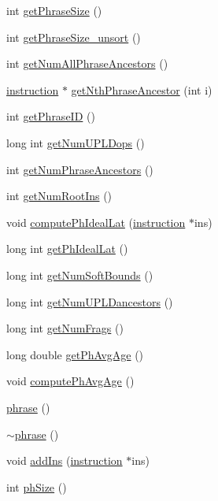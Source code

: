 \begin{DoxyCompactItemize}
\item 
int \hyperlink{classphrase_acb8ddc582eefcd2c65366319f89465f9}{getPhraseSize} ()
\item 
int \hyperlink{classphrase_a214d303bd1646e75a45855c7b9712ac7}{getPhraseSize\_\-unsort} ()
\item 
int \hyperlink{classphrase_afa8a3db74c2282bac47b136ddc8441e5}{getNumAllPhraseAncestors} ()
\item 
\hyperlink{classinstruction}{instruction} $\ast$ \hyperlink{classphrase_aaaaaefe94a150907b1cff6f99bb45d0a}{getNthPhraseAncestor} (int i)
\item 
int \hyperlink{classphrase_af752a00d3a1ec5ff1df4614ceb959027}{getPhraseID} ()
\item 
long int \hyperlink{classphrase_a48e689fefaabe6f63f6987e25fd70159}{getNumUPLDops} ()
\item 
int \hyperlink{classphrase_a8233a60f6da58ab8a72762da871e202f}{getNumPhraseAncestors} ()
\item 
int \hyperlink{classphrase_a15938fc7a89b507ee68da569a8446552}{getNumRootIns} ()
\item 
void \hyperlink{classphrase_a3802e4135d44de3591bf71a939b37123}{computePhIdealLat} (\hyperlink{classinstruction}{instruction} $\ast$ins)
\item 
long int \hyperlink{classphrase_ae207e38d77f69c4728278686822a901b}{getPhIdealLat} ()
\item 
long int \hyperlink{classphrase_afed9a471ff76a9155ccf016441753456}{getNumSoftBounds} ()
\item 
long int \hyperlink{classphrase_abcf56d6bce291a90c7a95f336b9230ea}{getNumUPLDancestors} ()
\item 
long int \hyperlink{classphrase_aad5e612377e6573abc754ad5b9dc2618}{getNumFrags} ()
\item 
long double \hyperlink{classphrase_a33410650cea51e32a4db3c0dde7a69dd}{getPhAvgAge} ()
\item 
void \hyperlink{classphrase_af6067e30694915a2f2bf40a83e0630f2}{computePhAvgAge} ()
\item 
\hyperlink{classphrase_a5439a7d7df8363555af7cb2746f05f54}{phrase} ()
\item 
\hyperlink{classphrase_a56e851a378479e92c1428e1c8a21018a}{$\sim$phrase} ()
\item 
void \hyperlink{classphrase_a69e0f555635552f11e0e24975f456139}{addIns} (\hyperlink{classinstruction}{instruction} $\ast$ins)
\item 
int \hyperlink{classphrase_ad40cdc9b84c26b91735e695d85e5da1a}{phSize} ()
\end{DoxyCompactItemize}


